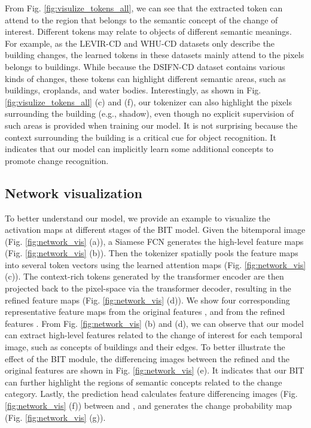 \documentclass[journal]{IEEEtran}
\begin{document}
From Fig. \ref{fig:visulize_tokens_all}, we can see that the extracted token can attend to the region that belongs to the semantic concept of the change of interest. Different tokens may relate to objects of different semantic meanings. For example, as the LEVIR-CD and WHU-CD datasets only describe the building changes, the learned tokens in these datasets mainly attend to the pixels belongs to buildings. While because the DSIFN-CD dataset contains various kinds of changes, these tokens can highlight different semantic areas, such as buildings, croplands, and water bodies. Interestingly, as shown in Fig. \ref{fig:visulize_tokens_all} (c) and (f), our tokenizer can also highlight the pixels surrounding the building (e.g., shadow), even though no explicit supervision of such areas is provided when training our model. It is not surprising because the context surrounding the building is a critical cue for object recognition. It indicates that our model can implicitly learn some additional concepts to promote change recognition. 


\subsection{Network visualization}
To better understand our model, we provide an example to visualize the activation maps at different stages of the BIT model. Given the bitemporal image (Fig. \ref{fig:network_vis} (a)), a Siamese FCN generates the high-level feature maps  (Fig. \ref{fig:network_vis} (b)). Then the tokenizer spatially pools the feature maps into several token vectors using the learned attention maps  (Fig. \ref{fig:network_vis} (c)). The context-rich tokens generated by the transformer encoder are then projected back to the pixel-space via the transformer decoder, resulting in the refined feature maps  (Fig. \ref{fig:network_vis} (d)). We show four corresponding representative feature maps from the original features , and from the refined features . From Fig. \ref{fig:network_vis} (b) and (d), we can observe that our model can extract high-level features related to the change of interest for each temporal image, such as concepts of buildings and their edges. To better illustrate the effect of the BIT module, the differencing images between the refined and the original features are shown in Fig. \ref{fig:network_vis} (e). It indicates that our BIT can further highlight the regions of semantic concepts related to the change category. Lastly, the prediction head calculates feature differencing images (Fig. \ref{fig:network_vis} (f)) between  and , and generates the change probability map  (Fig. \ref{fig:network_vis} (g)).
\end{document}
